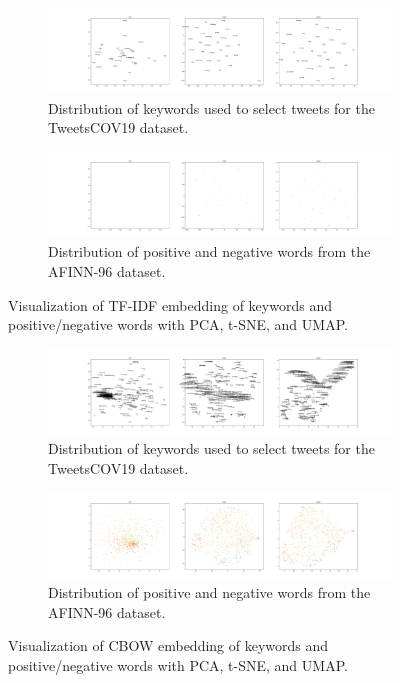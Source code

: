 \begin{figure}
 \centering
 \begin{subfigure}{\columnwidth}
 \includegraphics[width=1\textwidth]{images/keywords_tfidf.pdf}
 \caption{Distribution of keywords used to select tweets for the TweetsCOV19 dataset.}
 \label{fig:tfidf_key}
 \end{subfigure}
 \centering
 \begin{subfigure}{\columnwidth}
 \includegraphics[width=1\textwidth]{images/keywords_tfidf_posneg.pdf}
 \caption{Distribution of positive and negative words from the AFINN-96 dataset.}
  \label{fig:tfidf_posneg}
 \end{subfigure}
 \caption{Visualization of TF-IDF embedding of keywords and positive/negative words with PCA, t-SNE, and UMAP.}
 \label{fig:tfidf_viz}
\end{figure}

\begin{figure}
 \centering
 \begin{subfigure}{\columnwidth}
 \includegraphics[width=1\textwidth]{images/keywords_cbow.pdf}
 \caption{Distribution of keywords used to select tweets for the TweetsCOV19 dataset.}
 \label{fig:cbow_key}
 \end{subfigure}
 \centering
 \begin{subfigure}{\columnwidth}
 \includegraphics[width=1\textwidth]{images/keywords_cbow_posneg.pdf}
 \caption{Distribution of positive and negative words from the AFINN-96 dataset.}
  \label{fig:cbow_posneg}
 \end{subfigure}
 \caption{Visualization of CBOW embedding of keywords and positive/negative words with PCA, t-SNE, and UMAP.}
 \label{fig:cbow_viz}
\end{figure}


